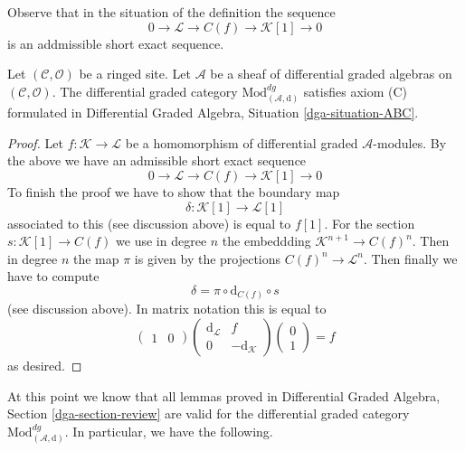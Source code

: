 \noindent
Observe that in the situation of the definition the sequence
$$
0 \to \mathcal{L} \to C(f) \to \mathcal{K}[1] \to 0
$$
is an addmissible short exact sequence.

\begin{lemma}
\label{lemma-axiom-C}
Let $(\mathcal{C}, \mathcal{O})$ be a ringed site.
Let $\mathcal{A}$ be a sheaf of differential graded algebras
on $(\mathcal{C}, \mathcal{O})$.
The differential graded category
$\text{Mod}^{dg}_{(\mathcal{A}, \text{d})}$
satisfies axiom (C) formulated in
Differential Graded Algebra, Situation \ref{dga-situation-ABC}.
\end{lemma}

\begin{proof}
Let $f : \mathcal{K} \to \mathcal{L}$
be a homomorphism of differential graded $\mathcal{A}$-modules.
By the above we have an admissible short exact sequence
$$
0 \to \mathcal{L} \to C(f) \to \mathcal{K}[1] \to 0
$$
To finish the proof we have to show that the boundary map
$$
\delta : \mathcal{K}[1] \to \mathcal{L}[1]
$$
associated to this (see discussion above) is equal to $f[1]$.
For the section $s : \mathcal{K}[1] \to C(f)$ we use in degree
$n$ the embeddding $\mathcal{K}^{n + 1} \to C(f)^n$. Then
in degree $n$ the map $\pi$ is given by the projections
$C(f)^n \to \mathcal{L}^n$. Then finally we have to compute
$$
\delta = \pi \circ \text{d}_{C(f)} \circ s
$$
(see discussion above). In matrix notation this is equal to
$$
\left(
\begin{matrix}
1 & 0
\end{matrix}
\right)
\left(
\begin{matrix}
\text{d}_\mathcal{L} & f \\
0 & -\text{d}_\mathcal{K}
\end{matrix}
\right)
\left(
\begin{matrix}
0 \\
1
\end{matrix}
\right) = f
$$
as desired.
\end{proof}

\noindent
At this point we know that all lemmas proved in
Differential Graded Algebra, Section \ref{dga-section-review}
are valid for the differential graded category
$\text{Mod}^{dg}_{(\mathcal{A}, \text{d})}$.
In particular, we have the following.

